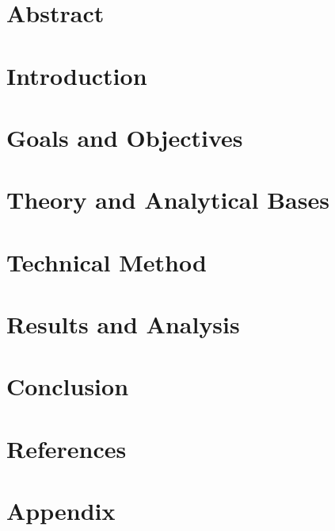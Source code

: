 \documentclass[a4paper,12pt,twocolumn]{article}
\begin{document}
	\pagebreak
	\section{Abstract}\label{sec:abstract}
	
	
	\section{Introduction}\label{sec:introduction}
	

	\section{Goals and Objectives}\label{sec:objectives}
	

	\section{Theory and Analytical Bases}\label{sec:theory}
	

	\section{Technical Method}\label{sec:methods}
	
	\pagebreak
	\section{Results and Analysis}\label{sec:results}
	

	\section{Conclusion}\label{sec:conclusion}
	

	\section{References}
	\printbibliography
	\onecolumn
	\section{Appendix}\label{sec:appendix}
	
	
\end{document}
